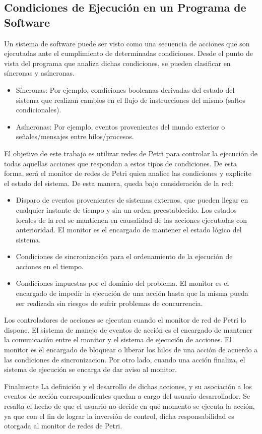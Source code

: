 \subsection{Condiciones de Ejecución en un Programa de Software}
\label{sec:condiciones_ejecucion}
Un sistema de software puede ser visto como una secuencia de acciones que son
ejecutadas ante el cumplimiento de determinadas condiciones. Desde el punto de
vista del programa que analiza dichas condiciones, se pueden clasificar
en síncronas y asíncronas.
  \begin{itemize}
	\item Síncronas: Por ejemplo, condiciones booleanas derivadas del estado del
		sistema que realizan cambios en el flujo de instrucciones del mismo (saltos
		condicionales).
	\item Asíncronas: Por ejemplo, eventos provenientes del mundo exterior o
		señales/mensajes entre hilos/procesos.
  \end{itemize}
El objetivo de este trabajo es utilizar redes de Petri para controlar la
ejecución de todas aquellas acciones que respondan a estos tipos de condiciones.
De esta forma, será el monitor de redes de Petri quien analice las condiciones y
explicite el estado del sistema. De esta manera, queda bajo consideración de la red:
\begin{itemize}
  \item Disparo de eventos provenientes de sistemas externos, que pueden llegar
  en cualquier instante de tiempo y sin un orden preestablecido. Los estados
  locales de la red se mantienen en causalidad de las acciones ejecutadas con
  anterioridad. El monitor es el encargado de mantener el estado lógico del
  sistema.
  
  \item Condiciones de sincronización para el ordenamiento de la ejecución de
  acciones en el tiempo. 
  
  \item Condiciones impuestas por el dominio del problema. El monitor es el
  encargado de impedir la ejecución de una acción hasta que la misma pueda ser
  realizada sin riesgos de sufrir problemas de concurrencia.
\end{itemize}

Los controladores de acciones se ejecutan cuando el monitor de red de Petri lo
dispone. El sistema de manejo de eventos de acción es el encargado de mantener
la comunicación entre el monitor y el sistema de ejecución de acciones. El
monitor es el encargado de bloquear o liberar los hilos de una acción de acuerdo
a las condiciones de sincronizacion. Por otro lado, cuando una
acción finaliza, el sistema de ejecución se encarga de dar aviso al monitor.

Finalmente La definición y el desarrollo de dichas acciones, y su
asociación a los eventos de acción correspondientes quedan a cargo del usuario
desarrollador. Se resalta el hecho de que el usuario no decide en qué momento se
ejecuta la acción, ya que con el fin de lograr la inversión de control,
dicha responsabilidad es otorgada al monitor de redes de Petri.

